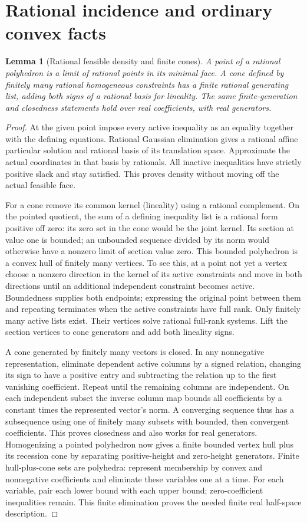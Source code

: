 \documentclass[11pt]{article}
\newtheorem{lemma}[theorem]{Lemma}
\begin{document}
\section{Rational incidence and ordinary convex facts}
\begin{lemma}[Rational feasible density and finite cones]\label{rational}
A point of a rational polyhedron is a limit of rational points in its minimal face. A cone defined by finitely many rational homogeneous constraints has a finite rational generating list, adding both signs of a rational basis for lineality. The same finite-generation and closedness statements hold over real coefficients, with real generators.
\end{lemma}
\begin{proof}
At the given point impose every active inequality as an equality together with the defining equations. Rational Gaussian elimination gives a rational affine particular solution and rational basis of its translation space. Approximate the actual coordinates in that basis by rationals. All inactive inequalities have strictly positive slack and stay satisfied. This proves density without moving off the actual feasible face.

For a cone remove its common kernel (lineality) using a rational complement. On the pointed quotient, the sum of a defining inequality list is a rational form positive off zero: its zero set in the cone would be the joint kernel. Its section at value one is bounded; an unbounded sequence divided by its norm would otherwise have a nonzero limit of section value zero. This bounded polyhedron is a convex hull of finitely many vertices. To see this, at a point not yet a vertex choose a nonzero direction in the kernel of its active constraints and move in both directions until an additional independent constraint becomes active. Boundedness supplies both endpoints; expressing the original point between them and repeating terminates when the active constraints have full rank. Only finitely many active lists exist. Their vertices solve rational full-rank systems. Lift the section vertices to cone generators and add both lineality signs.

A cone generated by finitely many vectors is closed. In any nonnegative representation, eliminate dependent active columns by a signed relation, changing its sign to have a positive entry and subtracting the relation up to the first vanishing coefficient. Repeat until the remaining columns are independent. On each independent subset the inverse column map bounds all coefficients by a constant times the represented vector's norm. A converging sequence thus has a subsequence using one of finitely many subsets with bounded, then convergent coefficients. This proves closedness and also works for real generators. Homogenizing a pointed polyhedron now gives a finite bounded vertex hull plus its recession cone by separating positive-height and zero-height generators. Finite hull-plus-cone sets are polyhedra: represent membership by convex and nonnegative coefficients and eliminate these variables one at a time. For each variable, pair each lower bound with each upper bound; zero-coefficient inequalities remain. This finite elimination proves the needed finite real half-space description.
\end{proof}
\end{document}
